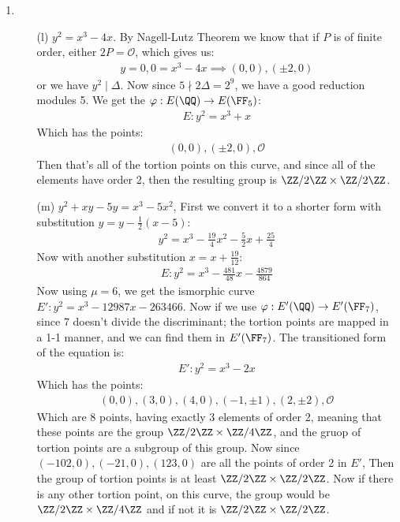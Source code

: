 \begin{enumerate}[label=]
    \item   
    \begin{itemize}
        \item[(l)]
            $y^2 = x^3 - 4x$. By Nagell-Lutz Theorem we know that if $P$ is of finite order, either $2P = \mathcal O$, which gives us:
            \begin{gather*}
                y = 0, 0 = x^3 - 4x \implies (0, 0), (\pm 2, 0)
            \end{gather*}
            or we have $y^2 \mid \Delta$. Now since $5 \nmid 2 \Delta = 2^9$, we have a good reduction modules 5. We get the $\varphi: E(\QQ) \to E(\FF_5)$:
            \begin{gather*}
                E: y^2 = x^3 + x
            \end{gather*}
            Which has the points:
            \begin{gather*}
                (0, 0), (\pm 2, 0), \mathcal O
            \end{gather*}
            Then that's all of the tortion points on this curve, and since all of the elements have order 2, then the resulting group is $\ZZ/2\ZZ \times \ZZ / 2\ZZ$.
        \item[(m)]
            $y^2 + xy - 5y = x^3 - 5x^2$, First we convert it to a shorter form with substitution $y = y - \frac{1}{2}(x - 5)$:
            \begin{gather*}
                y^2 = x^3 -\frac{19}{4}x^2 - \frac{5}{2}x + \frac{25}{4}
            \end{gather*}
            Now with another substitution $x = x + \frac{19}{12}$:
            \begin{gather*}
                E: y^2 = x^3 - \frac{481}{48} x - \frac{4879}{864}
            \end{gather*}
            Now using $\mu = 6$, we get the ismorphic curve $E': y^2 = x^3 - 12987 x - 263466$.
            Now if we use $\varphi: E'(\QQ) \to E'(\FF_7)$, since $7$ doesn't divide the discriminant;
            the tortion points are mapped in a 1-1 manner, and we can find them in $E'(\FF_7)$.
            The transitioned form of the equation is:
            \begin{gather*}
                E': y^2 = x^3 - 2x
            \end{gather*}
            Which has the points: 
            \begin{gather*}
                (0, 0), (3, 0), (4, 0), (-1, \pm 1), (2, \pm 2), \mathcal O
            \end{gather*}
            Which are $8$ points, having exactly 3 elements of order 2, meaning that these points are the group $\ZZ/2\ZZ \times \ZZ / 4\ZZ$, and the gruop  of tortion points are a subgroup of this group. Now since $(-102, 0), (-21, 0), (123, 0)$ are all the points of order 2 in $E'$, Then the group of tortion points is at least $\ZZ / 2\ZZ \times \ZZ / 2\ZZ$. Now if there is any other tortion point, on this curve, the group would be $\ZZ / 2\ZZ \times \ZZ / 4\ZZ$ and if not it is $\ZZ / 2\ZZ \times \ZZ / 2\ZZ$.
    \end{itemize}
\end{enumerate}
